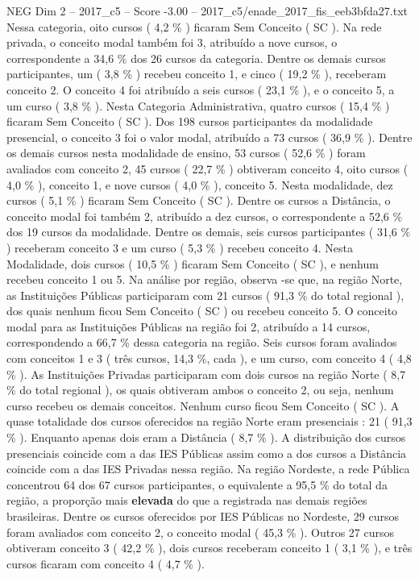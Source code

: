 \begin{textsample}{NEG Dim 2 – 2017\_c5 – Score -3.00 – 2017\_c5/enade\_2017\_fis\_eeb3bfda27.txt}
Nessa categoria, oito cursos ( 4,2 \% ) ficaram Sem Conceito ( SC ).
Na rede privada, o conceito modal também foi 3, atribuído a nove cursos, o correspondente a 34,6 \% dos 26 cursos da categoria.
Dentre os demais cursos participantes, um ( 3,8 \% ) recebeu conceito 1, e cinco ( 19,2 \% ), receberam conceito 2.
O conceito 4 foi atribuído a seis cursos ( 23,1 \% ), e o conceito 5, a um curso ( 3,8 \% ).
Nesta Categoria Administrativa, quatro cursos ( 15,4 \% ) ficaram Sem Conceito ( SC ).
Dos 198 cursos participantes da modalidade presencial, o conceito 3 foi o valor modal, atribuído a 73 cursos ( 36,9 \% ).
Dentre os demais cursos nesta modalidade de ensino, 53 cursos ( 52,6 \% ) foram avaliados com conceito 2, 45 cursos ( 22,7 \% ) obtiveram conceito 4, oito cursos ( 4,0 \% ), conceito 1, e nove cursos ( 4,0 \% ), conceito 5.
Nesta modalidade, dez cursos ( 5,1 \% ) ficaram Sem Conceito ( SC ).
Dentre os cursos a Distância, o conceito modal foi também 2, atribuído a dez cursos, o correspondente a 52,6 \% dos 19 cursos da modalidade.
Dentre os demais, seis cursos participantes ( 31,6 \% ) receberam conceito 3 e um curso ( 5,3 \% ) recebeu conceito 4.
Nesta Modalidade, dois cursos ( 10,5 \% ) ficaram Sem Conceito ( SC ), e nenhum recebeu conceito 1 ou 5.
Na análise por região, observa -se que, na região Norte, as Instituições Públicas participaram com 21 cursos ( 91,3 \% do total regional ), dos quais nenhum ficou Sem Conceito ( SC ) ou recebeu conceito 5.
O conceito modal para as Instituições Públicas na região foi 2, atribuído a 14 cursos, correspondendo a 66,7 \% dessa categoria na região.
Seis cursos foram avaliados com conceitos 1 e 3 ( três cursos, 14,3 \%, cada ), e um curso, com conceito 4 ( 4,8 \% ).
As Instituições Privadas participaram com dois cursos na região Norte ( 8,7 \% do total regional ), os quais obtiveram ambos o conceito 2, ou seja, nenhum curso recebeu os demais conceitos.
Nenhum curso ficou Sem Conceito ( SC ).
A quase totalidade dos cursos oferecidos na região Norte eram presenciais : 21 ( 91,3 \% ).
Enquanto apenas dois eram a Distância ( 8,7 \% ).
A distribuição dos cursos presenciais coincide com a das IES Públicas assim como a dos cursos a Distância coincide com a das IES Privadas nessa região.
Na região Nordeste, a rede Pública concentrou 64 dos 67 cursos participantes, o equivalente a 95,5 \% do total da região, a proporção mais \textbf{elevada} do que a registrada nas demais regiões brasileiras.
Dentre os cursos oferecidos por IES Públicas no Nordeste, 29 cursos foram avaliados com conceito 2, o conceito modal ( 45,3 \% ).
Outros 27 cursos obtiveram conceito 3 ( 42,2 \% ), dois cursos receberam conceito 1 ( 3,1 \% ), e três cursos ficaram com conceito 4 ( 4,7 \% ).

\end{textsample}
